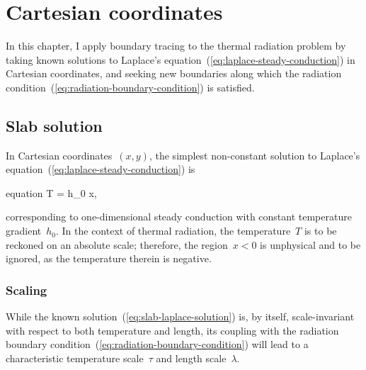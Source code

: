 \chapter{Cartesian coordinates}
\label{ch:cartesian}

In this chapter,
I apply boundary tracing to the thermal radiation problem
by taking known solutions
to Laplace's equation~(\ref{eq:laplace-steady-conduction})
in Cartesian coordinates,
and seeking new boundaries along which
the radiation condition~(\ref{eq:radiation-boundary-condition})
is satisfied.

\section{Slab solution}
\label{sec:cartesian.slab}

In Cartesian coordinates~$(x, y)$,
the simplest non-constant solution
to Laplace's equation~(\ref{eq:laplace-steady-conduction})
is
\begin{important}{equation}
  T = h_0 x,
  \label{eq:slab-laplace-solution}
\end{important}
corresponding to one-dimensional steady conduction
with constant temperature gradient~$h_0$.
In the context of thermal radiation,
the temperature~$T$ is to be reckoned on an absolute scale;
therefore, the region~$x < 0$ is unphysical and to be ignored,
as the temperature therein is negative.

\subsection{Scaling}
\label{sec:cartesian.slab.scaling}

While the known solution~(\ref{eq:slab-laplace-solution}) is, by itself,
scale-invariant with respect to both temperature and length,
its coupling with
the radiation boundary condition~(\ref{eq:radiation-boundary-condition})
will lead to a characteristic temperature scale~$\tau$
and length scale~$\lambda$.

